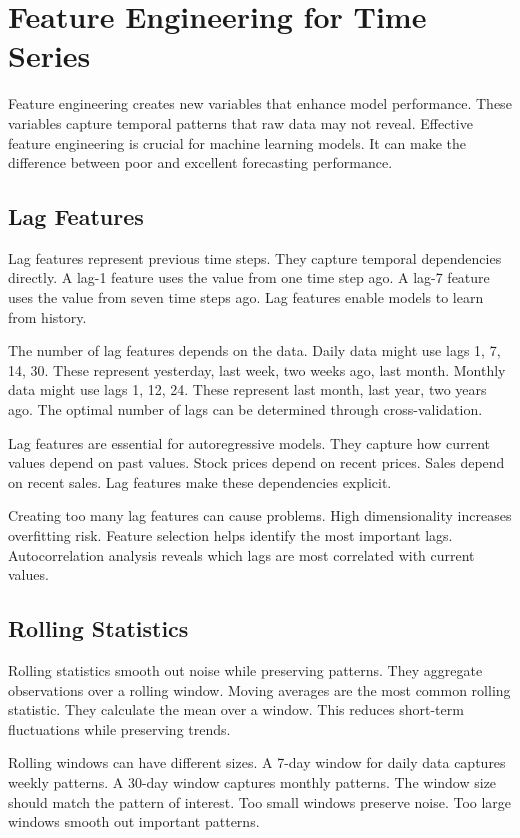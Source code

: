 \section{Feature Engineering for Time Series}

Feature engineering creates new variables that enhance model performance. These variables capture temporal patterns that raw data may not reveal. Effective feature engineering is crucial for machine learning models. It can make the difference between poor and excellent forecasting performance.

\subsection{Lag Features}

Lag features represent previous time steps. They capture temporal dependencies directly. A lag-1 feature uses the value from one time step ago. A lag-7 feature uses the value from seven time steps ago. Lag features enable models to learn from history.

The number of lag features depends on the data. Daily data might use lags 1, 7, 14, 30. These represent yesterday, last week, two weeks ago, last month. Monthly data might use lags 1, 12, 24. These represent last month, last year, two years ago. The optimal number of lags can be determined through cross-validation.

Lag features are essential for autoregressive models. They capture how current values depend on past values. Stock prices depend on recent prices. Sales depend on recent sales. Lag features make these dependencies explicit.

Creating too many lag features can cause problems. High dimensionality increases overfitting risk. Feature selection helps identify the most important lags. Autocorrelation analysis reveals which lags are most correlated with current values.

\subsection{Rolling Statistics}

Rolling statistics smooth out noise while preserving patterns. They aggregate observations over a rolling window. Moving averages are the most common rolling statistic. They calculate the mean over a window. This reduces short-term fluctuations while preserving trends.

Rolling windows can have different sizes. A 7-day window for daily data captures weekly patterns. A 30-day window captures monthly patterns. The window size should match the pattern of interest. Too small windows preserve noise. Too large windows smooth out important patterns.

